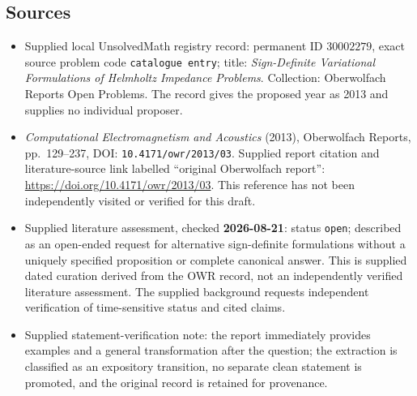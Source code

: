 \documentclass[11pt]{article}
\begin{document}
\subsection{Sources}
\begin{itemize}
\item Supplied local UnsolvedMath registry record: permanent ID \(30002279\), exact source problem code \texttt{catalogue entry}; title: \emph{Sign-Definite Variational Formulations of Helmholtz Impedance Problems}. Collection: Oberwolfach Reports Open Problems. The record gives the proposed year as 2013 and supplies no individual proposer.
\item \emph{Computational Electromagnetism and Acoustics} (2013), Oberwolfach Reports, pp.\ 129--237, DOI: \texttt{10.4171/owr/2013/03}. Supplied report citation and literature-source link labelled ``original Oberwolfach report'': \url{https://doi.org/10.4171/owr/2013/03}. This reference has not been independently visited or verified for this draft.
\item Supplied literature assessment, checked \textbf{2026-08-21}: status \texttt{open}; described as an open-ended request for alternative sign-definite formulations without a uniquely specified proposition or complete canonical answer. This is supplied dated curation derived from the OWR record, not an independently verified literature assessment. The supplied background requests independent verification of time-sensitive status and cited claims.
\item Supplied statement-verification note: the report immediately provides examples and a general transformation after the question; the extraction is classified as an expository transition, no separate clean statement is promoted, and the original record is retained for provenance.
\end{itemize}
\end{document}
